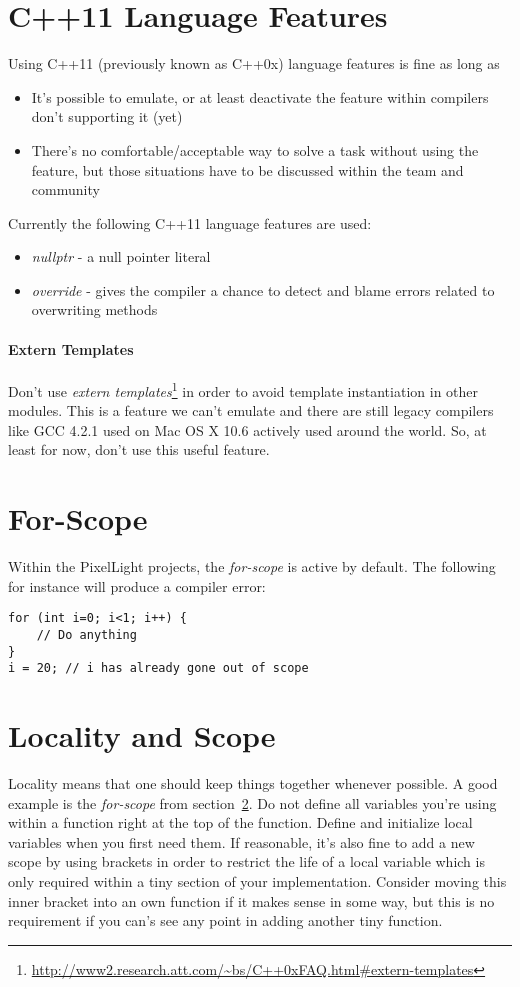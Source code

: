 \section{C++11 Language Features}
Using C++11 (previously known as C++0x) language features is fine as long as
\begin{itemize}
\item{It's possible to emulate, or at least deactivate the feature within compilers don't supporting it (yet)}
\item{There's no comfortable/acceptable way to solve a task without using the feature, but those situations have to be discussed within the team and community}
\end{itemize}
\textsl{}
Currently the following C++11 language features are used:
\begin{itemize}
\item{\emph{nullptr} - a null pointer literal}
\item{\emph{override} - gives the compiler a chance to detect and blame errors related to overwriting methods}
\end{itemize}


\paragraph{Extern Templates}
Don't use \emph{extern templates}\footnote{\url{http://www2.research.att.com/~bs/C++0xFAQ.html\#extern-templates}} in order to avoid template instantiation in other modules. This is a feature we can't emulate and there are still legacy compilers like \ac{GCC} 4.2.1 used on Mac OS X 10.6 actively used around the world. So, at least for now, don't use this useful feature.




\section{For-Scope}
\label{General:For-Scope}
Within the PixelLight projects, the \emph{for-scope} is active by default. The following for instance will produce a compiler error:
\begin{lstlisting}[caption=for-scope]
for (int i=0; i<1; i++) {
	// Do anything
}
i = 20;	// i has already gone out of scope
\end{lstlisting}




\section{Locality and Scope}
Locality means that one should keep things together whenever possible. A good example is the \emph{for-scope} from section~\ref{General:For-Scope}. Do not define all variables you're using within a function right at the top of the function. Define and initialize local variables when you first need them. If reasonable, it's also fine to add a new scope by using brackets in order to restrict the life of a local variable which is only required within a tiny section of your implementation. Consider moving this inner bracket into an own function if it makes sense in some way, but this is no requirement if you can's see any point in adding another tiny function.

